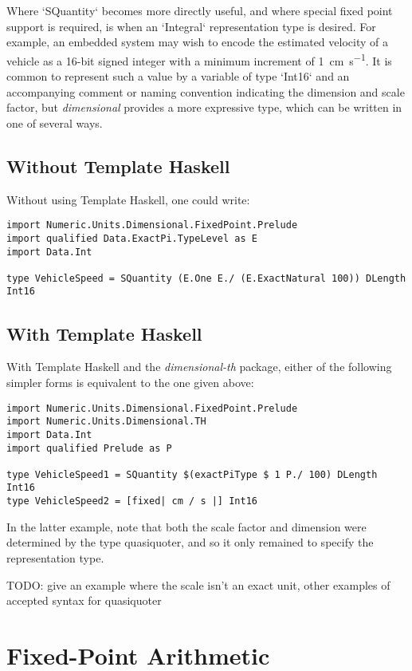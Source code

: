 \documentclass[11pt]{report}
\newcommand{\packagename}[1]{\textit{#1}}
\newcommand{\thispackage}{\packagename{dimensional}}
\begin{document}
Where `SQuantity` becomes more directly useful, and where special fixed point support is required, is when an
`Integral` representation type is desired. For example, an embedded system may wish to encode the estimated
velocity of a vehicle as a 16-bit signed integer with a minimum increment of \SI{1}{\centi\meter\per\second}. It is common
to represent such a value by a variable of type `Int16` and an accompanying comment or naming convention indicating
the dimension and scale factor, but \thispackage{} provides a more expressive type, which can be written in one of several ways.

\subsection{Without Template Haskell}

Without using Template Haskell, one could write:

\begin{lstlisting}
import Numeric.Units.Dimensional.FixedPoint.Prelude
import qualified Data.ExactPi.TypeLevel as E
import Data.Int

type VehicleSpeed = SQuantity (E.One E./ (E.ExactNatural 100)) DLength Int16
\end{lstlisting}

\subsection{With Template Haskell} \label{fixed-point-th}

With Template Haskell and the \packagename{dimensional-th} package, either of the following simpler forms is equivalent to the one given above:

\begin{lstlisting}
import Numeric.Units.Dimensional.FixedPoint.Prelude
import Numeric.Units.Dimensional.TH
import Data.Int
import qualified Prelude as P

type VehicleSpeed1 = SQuantity $(exactPiType $ 1 P./ 100) DLength Int16
type VehicleSpeed2 = [fixed| cm / s |] Int16
\end{lstlisting}

In the latter example, note that both the scale factor and dimension were determined by the type quasiquoter, and so it
only remained to specify the representation type.

TODO: give an example where the scale isn't an exact unit, other examples of accepted syntax for quasiquoter

\section{Fixed-Point Arithmetic}
\end{document}
